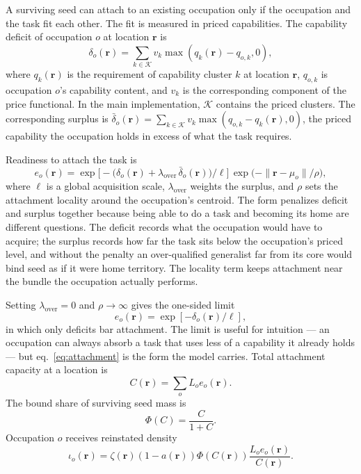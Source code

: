 \documentclass[12pt, a4paper]{article}
\begin{document}
A surviving seed can attach to an existing occupation only if the
occupation and the task fit each other. The fit is measured in priced
capabilities. The capability deficit of occupation $o$ at location
$\mathbf{r}$ is
\begin{equation}
  \delta_o(\mathbf{r})
  =
  \sum_{k\in\mathcal K}
  v_k
  \max(q_k(\mathbf{r})-q_{o,k},0),
  \label{eq:deficit}
\end{equation}
where $q_k(\mathbf{r})$ is the requirement of capability cluster $k$ at
location $\mathbf{r}$, $q_{o,k}$ is occupation $o$'s capability content,
and $v_k$ is the corresponding component of the price functional. In
the main implementation, $\mathcal K$ contains the priced clusters. The
corresponding surplus is
$\bar\delta_o(\mathbf{r})=\sum_{k\in\mathcal K}
v_k\max(q_{o,k}-q_k(\mathbf{r}),0)$, the priced capability the
occupation holds in excess of what the task requires.

Readiness to attach the task is
\begin{equation}
  e_o(\mathbf{r})
  =
  \exp\!\bigl[
    -\bigl(\delta_o(\mathbf{r})
    +\lambda_{\mathrm{over}}\,\bar\delta_o(\mathbf{r})\bigr)/\ell
  \bigr]
  \,
  \exp\bigl(-\|\mathbf{r}-\mu_o\|/\rho\bigr),
  \label{eq:attachment}
\end{equation}
where $\ell$ is a global acquisition scale,
$\lambda_{\mathrm{over}}$ weights the surplus, and $\rho$ sets the
attachment locality around the occupation's centroid. The form
penalizes deficit and surplus together because being able to do a task
and becoming its home are different questions. The deficit records
what the occupation would have to acquire; the surplus records how far
the task sits below the occupation's priced level, and without the
penalty an over-qualified generalist far from its core would bind seed
as if it were home territory. The locality term keeps attachment near
the bundle the occupation actually performs.

Setting $\lambda_{\mathrm{over}}=0$ and $\rho\to\infty$ gives the
one-sided limit
\begin{equation}
  e_o(\mathbf{r})
  =
  \exp[-\delta_o(\mathbf{r})/\ell],
  \label{eq:readiness}
\end{equation}
in which only deficits bar attachment. The limit is useful for
intuition --- an occupation can always absorb a task that uses less of
a capability it already holds --- but eq.~\eqref{eq:attachment} is the
form the model carries. Total attachment capacity at
a location is
\[
  C(\mathbf{r})
  =
  \sum_o L_o e_o(\mathbf{r}).
\]
The bound share of surviving seed mass is
\[
  \Phi(C) = \frac{C}{1+C}.
\]
Occupation $o$ receives reinstated density
\begin{equation}
  \iota_o(\mathbf{r})
  =
  \zeta(\mathbf{r})
  (1-a(\mathbf{r}))
  \Phi(C(\mathbf{r}))
  \frac{
    L_o e_o(\mathbf{r})
  }{
    C(\mathbf{r})
  }.
  \label{eq:reinstated}
\end{equation}
\end{document}
